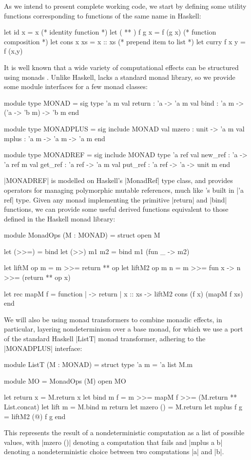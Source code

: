 As we intend to present complete working code, we start by defining some utility
functions corresponding to functions of the same name in Haskell:
\begin{ocaml}
	let id x = x               (* identity function *)
	let ( ** ) f g x = f (g x)  (* function composition *)
	let cons x xs = x :: xs     (* prepend item to list *)
	let curry f x y = f (x,y)
\end{ocaml}
It is well known that a wide variety of computational effects can be structured
using monads \cite{Wadler1992}. Unlike Haskell, \OCaml lacks a standard
monad library, so we provide some module interfaces for a few monad classes:
\begin{ocaml}
	module type MONAD = sig
		type 'a m
		val return : 'a -> 'a m
		val bind : 'a m -> ('a -> 'b m) -> 'b m
	end

	module type MONADPLUS = sig
		include MONAD
		val mzero : unit -> 'a m
		val mplus : 'a m -> 'a m -> 'a m
	end

	module type MONADREF = sig
		include MONAD
		type 'a ref
		val new_ref : 'a -> 'a ref m
		val get_ref : 'a ref -> 'a m
		val put_ref : 'a ref -> 'a -> unit m
	end
\end{ocaml}
|MONADREF| is modelled on Haskell's |MonadRef| type class, and provides operators for managing
polymorphic mutable references, much like \OCaml's built in |'a ref| type.
Given any monad implementing the primitive |return| and
|bind| functions, we can provide some useful derived functions equivalent
to those defined in the Haskell monad library:
\begin{ocaml}
	module MonadOps (M : MONAD) = struct
		open M

		let (>>=) = bind
		let (>>) m1 m2 = bind m1 (fun _ -> m2)

		let liftM op m = m >>= return ** op
		let liftM2 op m n = m >>= fun x -> n >>= (return ** op x)

		let rec mapM f = function 
			| {} -> return {}
			| x :: xs -> liftM2 cons (f x) (mapM f xs)
	end
\end{ocaml}
We will also be using monad transformers \cite{LiangHudakJones1995} to combine
monadic effects, in particular, layering nondeterminism over a base monad, for
which we use a port of the standard Haskell |ListT| monad transformer, adhering to the
|MONADPLUS| interface:
\begin{ocaml}
	module ListT (M : MONAD) = struct
		type 'a m = 'a list M.m
		
		module MO = MonadOps (M)
		open MO

		let return x = M.return {x}
		let bind m f = m >>= mapM f >>= (M.return ** List.concat)
		let lift m   = M.bind m return
		let mzero () = M.return {}
		let mplus f g = liftM2 (@) f g
	end
\end{ocaml}
This represents the result of a nondeterministic computation as a list
of possible values, with |mzero ()| denoting a computation that fails and |mplus a b|
denoting a nondeterministic choice between two computations |a| and |b|.

